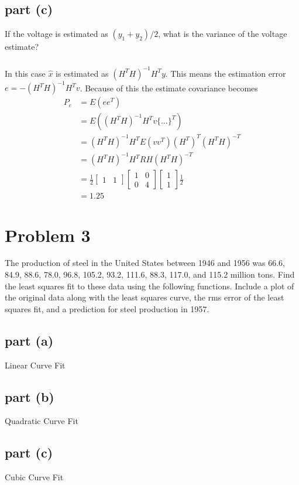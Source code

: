 \documentclass[11pt]{article}
\begin{document}
\subsection*{part (c)}
If the voltage is estimated as $(y_1+y_2)/2$, what is the variance of the voltage estimate?

\subparagraph*{}
In this case $\hat{x}$ is estimated as $(H^TH)^{-1}H^Ty$. This means the estimation error $e=-(H^TH)^{-1}H^Tv$. Because of this the estimate covariance becomes
\begin{align*}
	P_e &= E(ee^T) \\
	&= E((H^TH)^{-1}H^Tv\{\dots\}^T) \\
	&= (H^TH)^{-1} H^T E(vv^T) (H^T)^T(H^TH)^{-T} \\
	&= (H^TH)^{-1} H^T R H(H^TH)^{-T} \\
	&= \frac{1}{2} \begin{bmatrix} 1 & 1 \end{bmatrix} \begin{bmatrix} 1 & 0 \\ 0 & 4 \end{bmatrix} \begin{bmatrix} 1 \\ 1 \end{bmatrix} \frac{1}{2} \\
	&= 1.25
\end{align*}

\section*{Problem 3}
The production of steel in the United States between 1946 and 1956 was 66.6, 84.9, 88.6, 78.0, 96.8, 105.2, 93.2, 111.6, 88.3, 117.0, and 115.2 million tons. Find the least squares fit to these data using the following functions. Include a plot of the original data along with the least squares curve, the rms error of the least squares fit, and a prediction for steel production in 1957.

\subsection*{part (a)}
Linear Curve Fit

\subsection*{part (b)}
Quadratic Curve Fit

\subsection*{part (c)}
Cubic Curve Fit
\end{document}
